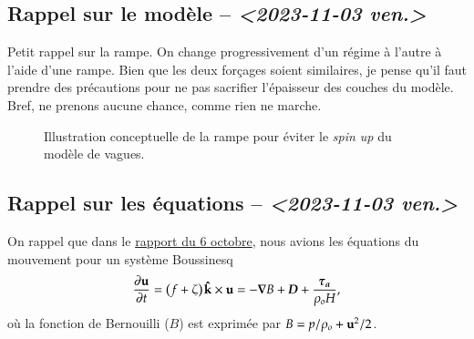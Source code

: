 \documentclass[10pt]{article}
\numberwithin{equation}{section}
\newcommand{\kvf}{\vb{\hat{k}}}
\newcommand{\uu}{\vb{u}}
\newcommand{\pt}{\hspace{1pt}} %
\begin{document}
\subsection{Rappel sur le modèle -- \textit{<2023-11-03 ven.>}}
\label{sec:orgf453c3d}

Petit rappel sur la rampe.
On change progressivement d'un régime à l'autre à l'aide d'une rampe.
Bien que les deux forçages soient similaires, je pense qu'il faut prendre des précautions pour ne pas sacrifier l'épaisseur des couches du modèle.
Bref, ne prenons aucune chance, comme rien ne marche.

\begin{figure}
\begin{center}
\end{center}
\caption{\label{org37c691f}Illustration conceptuelle de la rampe pour éviter le \emph{spin up} du modèle de vagues.}
\end{figure}

\subsection{Rappel sur les équations -- \textit{<2023-11-03 ven.>}}
\label{sec:org01077f7}

On rappel que dans le \href{rapport-2023-10-06.org}{rapport du 6 octobre}, nous avions les équations du mouvement pour un système Boussinesq
\begin{equation}
\label{eq:org753f8ad}
   \pdv{\uu}{t} = \qty(f+\zeta)\pt \kvf\times\uu = -\gradient{B} + \boldsymbol{D} + \frac{\boldsymbol{\tau_a}}{\rho_o H},
\end{equation}
où la fonction de Bernouilli (\(B\)) est exprimée par \(B = p/\rho_o + \uu^2/2\).\bigskip
\end{document}
